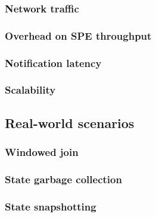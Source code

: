 \subsubsection{Network traffic}

\subsubsection{Overhead on SPE throughput}

\subsubsection{Notification latency}

\subsubsection{Scalability}

\subsection{Real-world scenarios} \label{real-world-scenarios}

\subsubsection{Windowed join}

\subsubsection{State garbage collection}

\subsubsection{State snapshotting}



